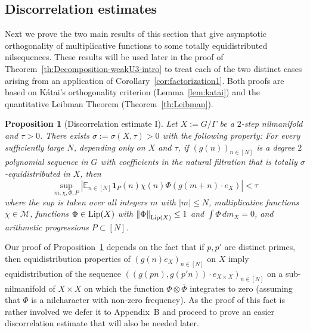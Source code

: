 \documentclass[11pt]{amsart}
\newtheorem{proposition}[lemma]{Proposition}
\theoremstyle{definition}
\begin{document}
\subsection{Discorrelation estimates}
Next we prove the two main results of this section that give
asymptotic orthogonality of multiplicative functions to some totally
equidistributed nilsequences. These results will be  used later in
the proof of Theorem~\ref{th:Decomposition-weakU3-intro}  to treat
each of the two distinct cases arising from an application of
Corollary~\ref{cor:factorization1}. Both proofs are based on
K\'atai's orthogonality criterion (Lemma~\ref{lem:katai}) and the
quantitative Leibman Theorem (Theorem~\ref{th:Leibman}).
\begin{proposition}[Discorrelation estimate I]
\label{lem:equid-square} Let $X:=G/\Gamma$ be a $2$-step nilmanifold
and  $\tau>0$. There exists  $\sigma:=\sigma(X,\tau)>0$ with the
following property: For every sufficiently large $N$, depending only
on $X$ and $\tau$, if
 $(g(n))_{n\in[N]}$ is a degree $2$ polynomial sequence in $G$ with
 coefficients in the natural filtration   that is  totally
$\sigma$-equidistributed in $X$, then
$$
\sup_{m,\chi, \Phi,P}|{{\mathbb E}}_{n\in[N]} {\mathbf{1}}_P(n)
\chi(n)\Phi(g(m+n)\cdot e_X)|<\tau
$$
where the sup is taken over  all integers $m$ with $|m|\leq N$, multiplicative
functions $\chi \in{{\mathcal M}}$, functions $\Phi\in {{\text{\rm Lip}}}(X)$ with
 ${\lVert \Phi \rVert}_{{{\text{\rm Lip}}}(X)}\leq 1$ and $\int \Phi\, dm_X=0$, and arithmetic
progressions $P\subset[N]$.
\end{proposition}
  Our proof of  Proposition~\ref{lem:equid-square}
depends on the fact
that if $p, p'$ are distinct primes, then  equidistribution properties of  $(g(n)e_X)_{n\in [N]}$ on $X$
imply equidistribution  of the sequence
$
((g(pn),g(p'n)) \cdot e_{X\times X})_{n\in [N]}
$
on a sub-nilmanifold of $X\times X$ on which the function $\Phi\otimes\overline \Phi$
integrates to zero (assuming that $\Phi$ is a nilcharacter with non-zero frequency).
As the proof
of this fact is rather involved  we defer it to Appendix~B and proceed to prove an easier discorrelation estimate that will also be needed later.
\end{document}
